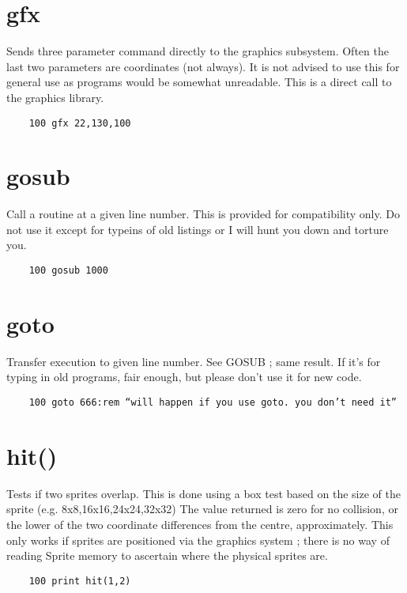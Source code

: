 \section*{gfx}
Sends three parameter command directly to the graphics subsystem. Often the last two parameters are coordinates (not always).  It is not advised to use this for general use as programs would be somewhat unreadable.
This is a direct call to the graphics library.
\example{}
\begin{verbatim}
	100 gfx 22,130,100
\end{verbatim}

\section*{gosub}
Call a routine at a given line number. This is provided for compatibility only. Do not use it except for typeins of old listings or I will hunt you down and torture you.  
\example{}
\begin{verbatim}
	100 gosub 1000
\end{verbatim}

\section*{goto}
Transfer execution to given line number. See GOSUB ; same result. If it's for typing in old programs, fair enough, but please don't use it for new code.
\example{}
\begin{verbatim}
	100 goto 666:rem “will happen if you use goto. you don’t need it”
\end{verbatim}

\section*{hit()}
Tests if two sprites overlap. This is done using a box test based on the size of the sprite (e.g. 8x8,16x16,24x24,32x32)
The value returned is zero for no collision, or the lower of the two coordinate differences from the centre, approximately.
This only works if sprites are positioned via the graphics system ; there is no way of reading Sprite memory to ascertain where the physical sprites are.
\example{}
\begin{verbatim}
	100 print hit(1,2)
\end{verbatim}

